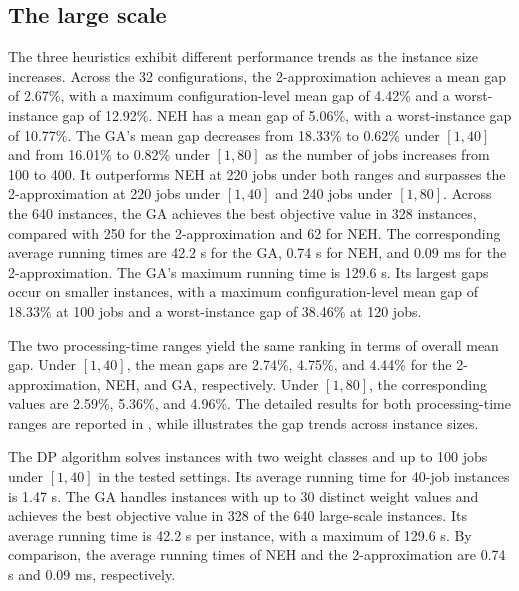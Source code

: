 \documentclass[12pt]{article}
\begin{document}
\begin{sloppypar}
        
        \subsection{The large scale}
        
        The three heuristics exhibit different performance trends as the
        instance size increases. Across the 32 configurations, the
        2-approximation achieves a mean gap of 2.67\%, with a maximum
        configuration-level mean gap of 4.42\% and a worst-instance gap
        of 12.92\%. NEH has a mean gap of 5.06\%, with a worst-instance
        gap of 10.77\%. The GA's mean gap decreases from 18.33\% to
        0.62\% under \([1,40]\) and from 16.01\% to 0.82\% under
        \([1,80]\) as the number of jobs increases from 100 to 400.
        It outperforms NEH at 220 jobs under both ranges and surpasses
        the 2-approximation at 220 jobs under \([1,40]\) and 240 jobs
        under \([1,80]\). Across the 640 instances, the GA achieves the
        best objective value in 328 instances, compared with 250 for
        the 2-approximation and 62 for NEH. The corresponding average
        running times are 42.2 s for the GA, 0.74 s for NEH, and
        0.09 ms for the 2-approximation. The GA's maximum running time
        is 129.6 s. Its largest gaps occur on smaller instances, with
        a maximum configuration-level mean gap of 18.33\% at 100 jobs
        and a worst-instance gap of 38.46\% at 120 jobs.
        
        The two processing-time ranges yield the same ranking in terms
        of overall mean gap. Under \([1,40]\), the mean gaps are 2.74\%,
        4.75\%, and 4.44\% for the 2-approximation, NEH, and GA,
        respectively. Under \([1,80]\), the corresponding values are
        2.59\%, 5.36\%, and 4.96\%. The detailed results for both
        processing-time ranges are reported in
        , while
         illustrates the gap trends across instance
        sizes.
        
        The DP algorithm solves instances with two weight classes and
        up to 100 jobs under \([1,40]\) in the tested settings. Its
        average running time for 40-job instances is 1.47 s. The GA
        handles instances with up to 30 distinct weight values and
        achieves the best objective value in 328 of the 640 large-scale
        instances. Its average running time is 42.2 s per instance,
        with a maximum of 129.6 s. By comparison, the average running
        times of NEH and the 2-approximation are 0.74 s and 0.09 ms,
        respectively.
        

\end{sloppypar}
\end{document}
